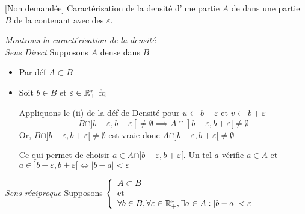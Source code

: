 \documentclass{article}
\renewenvironment{question_kholle}[2][ ]
{
	\subsection{\texorpdfstring{#2}{}}
	\notblank{#1}
	{
		\noindent #1
		\bigbreak
	}
	{}
	\begin{proof}
}
{
	\end{proof}
}
\begin{document}
\pagebreak
{}
	{[Non demandée] Caractérisation de la densité d’une partie $A$
		de \R dans une partie $B$ de \R la contenant avec des $\varepsilon$.}

	\textit{Montrons la caractérisation de la densité}\\
	\emph{Sens Direct} Supposons $A$ dense dans $B$
	\begin{itemize}[label=\textemdash]
		\item Par déf $A \subset B$
		\item Soit $b \in B$ et $\varepsilon \in \mathbb R_+^*$ fq

		      Appliquons le (ii) de la déf de Densité pour $u \leftarrow
			      b - \varepsilon$ et $v \leftarrow b + \varepsilon$
		      $$B \cap ]b - \varepsilon, b + \varepsilon[ \neq \emptyset
			      \implies A \cap ]b - \varepsilon,  b + \varepsilon[ \neq \emptyset$$
			      Or, $B \cap ]b - \varepsilon, b + \varepsilon[ \neq \emptyset$ est vraie
				      donc $A \cap ]b - \varepsilon,  b + \varepsilon[ \neq \emptyset$

				      Ce qui permet de choisir $a \in A \cap ]b - \varepsilon,  b +
		      \varepsilon[$.
				      Un tel $a$ vérifie $a \in A$ et $a \in ]b - \varepsilon,  b +
		      \varepsilon[ \iff |b-a| < \varepsilon$
	\end{itemize}
	\bigbreak
	\noindent \emph{Sens réciproque} Supposons $\left\{
		\begin{array}{ll} A \subset B \\\mathrm{et}\\ \forall b \in
			B, \forall \varepsilon \in \mathbb R_+^*, \exists a \in A: |b-a|<
			\varepsilon
		\end{array}\right.$


\end{question_kholle}
\end{document}
